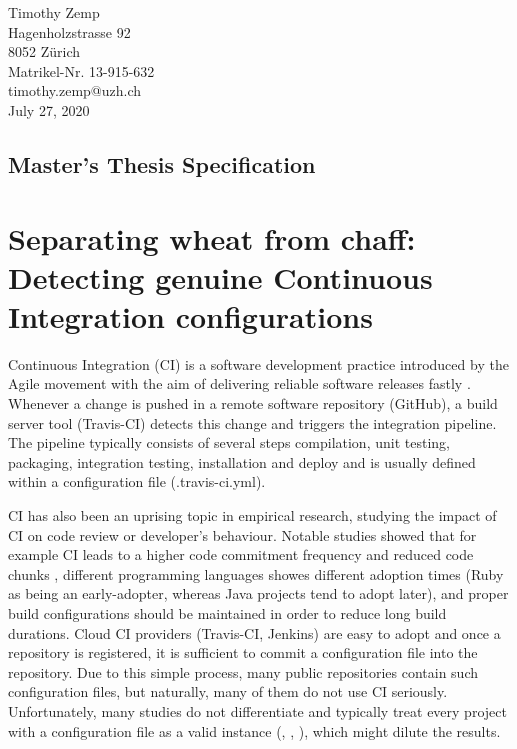 \documentclass{task_description}
\begin{document}
\thispagestyle{firstpage}
\vspace*{23mm}%
\hfill\parbox[t]{65mm}{

Timothy Zemp\\
Hagenholzstrasse 92\\
8052 Z\"urich\\[5mm]
Matrikel-Nr. 13-915-632\\
timothy.zemp@uzh.ch\\[15mm]
July 27, 2020 \\
}
\vspace*{5mm}
\subsection*{Master's Thesis Specification}

\section*{Separating wheat from chaff: Detecting genuine Continuous Integration configurations\hspace{1em}}

Continuous Integration (CI) is a software development practice introduced by the Agile movement with the aim of delivering reliable software releases fastly \cite{Humble:2010}. Whenever a change is pushed in a remote software repository (\eg GitHub), a build server tool (\eg Travis-CI) detects this change and triggers the integration pipeline. The pipeline typically consists of several steps \eg compilation, unit testing, packaging, integration testing, installation and deploy and is usually defined within a configuration file (\eg .travis-ci.yml).

CI has also been an uprising topic in empirical research, studying the impact of CI on code review or developer's behaviour. Notable studies showed that for example CI leads to a higher code commitment frequency and reduced code chunks \cite{zhao2017impact}, different programming languages showes different adoption times (\eg Ruby as being an early-adopter, whereas Java projects tend to adopt later)\cite{vasilescu2014continuous}, and proper build configurations should be maintained in order to reduce long build durations\cite{ghaleb2019empirical}.
Cloud CI providers (\eg Travis-CI, Jenkins) are easy to adopt and once a repository is registered, it is sufficient to commit a configuration file into the repository. Due to this simple process, many public repositories contain such configuration files, but naturally, many of them do not use CI seriously. Unfortunately, many studies do not differentiate and typically treat every project with a configuration file as a valid instance (\eg \cite{zhao2017impact}, \cite{vasilescu2014continuous}, \cite{ghaleb2019empirical}), which might dilute the results. 
\end{document}
